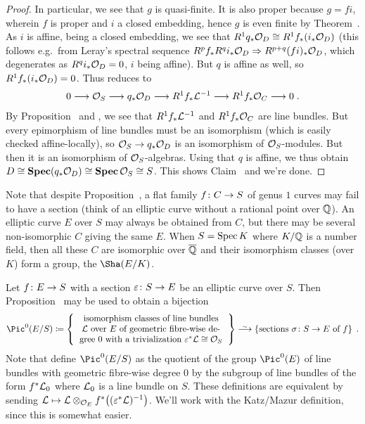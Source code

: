 \documentclass[a4paper,parskip=half,numbers=enddot, DIV=12]{scrreprt}
\begin{document}
\begin{proof}
	In particular, we see that $g$ is quasi-finite. It is also proper because $g=fi$, wherein $f$ is proper and $i$ a closed embedding, hence $g$ is even finite by Theorem~. As $i$ is affine, being a closed embedding, we see that $R^1q_*\mathcal{O}_D\cong R^1f_*(i_*\mathcal{O}_D)$ (this follows e.g.\ from Leray's spectral sequence $R^pf_*R^qi_*\Oo_D\converge R^{p+q}(fi)_*\Oo_D$, which degenerates as $R^qi_*\mathcal{O}_D=0$, $i$ being affine). But $q$ is affine as well, so $R^1f_*(i_*\mathcal{O}_D)=0$. Thus  reduces to 
	\begin{align}
		0\morphism \Oo_S\morphism q_*\Oo_D\morphism R^1f_*\Ll^{-1}\morphism R^1f_*\Oo_C\morphism 0\;.
	\end{align}
	By Proposition~ and , we see that $R^1f_*\mathcal{L}^{-1}$ and $R^1f_*\mathcal{O}_C$ are line bundles. But every epimorphism of line bundles must be an isomorphism (which is easily checked affine-locally), so $\Oo_S\morphism q_*\Oo_D$ is an isomorphism of $\mathcal{O}_S$-modules. But then it is an isomorphism of $\mathcal{O}_S$-algebras. Using that $q$ is affine, we thus obtain $D\cong \operatorname{\mathbf{Spec}} (q_*\mathcal{O}_D)\cong \operatorname{\mathbf{Spec}}\mathcal{O}_S\cong S$. This shows Claim~ and we're done.
\end{proof}
\begin{rem}
	Note that despite Proposition~, a flat family $f\colon C\morphism S$ of genus $1$ curves may fail to have a section (think of an elliptic curve without a rational point over $\mathbb{Q}$). An elliptic curve $E$ over $S$ may always be obtained from $C$, but there may be several non-isomorphic $C$ giving the same $E$. When $S=\operatorname{Spec} K$ where $K/\mathbb{Q}$ is a number field, then all these $C$ are isomorphic over $\overline{\mathbb{Q}}$ and their isomorphism classes (over $K$) form a group, the  $\Sha(E/K)$.
\end{rem}
	Let $f\colon E\morphism S$ with a section $\epsilon\colon S\morphism E$ be an elliptic curve over $S$. Then Proposition~ may be used to obtain a bijection
	\begin{align*}
		\Pic^0(E/S)\coloneqq\left\{\begin{tabular}{c}
			isomorphism classes of line bundles\\
			$\Ll$ over $E$ of geometric fibre-wise de-\\
			gree 0 with a trivialization $\epsilon^*\Ll\cong\Oo_S$
		\end{tabular}\right\}\isomorphism\left\{\text{sections }\sigma\colon S\to E\text{ of }f\right\}\;.
	\end{align*}
	Note that \cite[pp.~63--67]{katzmazur} define $\Pic^0(E/S)$ as the quotient of the group $\Pic^0(E)$ of line bundles with geometric fibre-wise degree $0$ by the subgroup of line bundles of the form $f^*\mathcal{L}_0$ where $\mathcal{L}_0$ is a line bundle on $S$. These definitions are equivalent by sending $\mathcal{L}\mapsto \mathcal{L}\otimes_{\mathcal{O}_E}f^*\big((\varepsilon^*\mathcal{L})^{-1}\big)$. We'll work with the Katz/Mazur definition, since this is somewhat easier.
	
\end{document}
